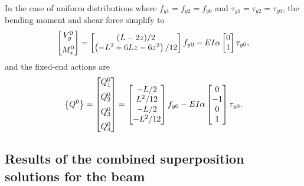 \documentclass{AeroStructure-ERJohnson}
\begin{document}
In the case of uniform distributions where $f_{y 1}=f_{y 2}=f_{y 0}$ and $\tau_{y 1}=\tau_{y 2}=\tau_{y 0}$, the bending moment and shear force simplify to
\begin{align}\label{eq16.55}
\left[\begin{array}{@{}c@{}}V_{y}^{0} \\[6pt] M_{x}^{0}\end{array}\right]=\left[\begin{array}{@{}c@{}}(L-2 z) / 2 \\\left(-L^{2}+6 L z-6 z^{2}\right) / 12\end{array}\right] f_{y 0}-E I \alpha\left[\begin{array}{@{}l@{}}0 \\1\end{array}\right] \tau_{y 0},
\end{align}
and the fixed-end actions are
\begin{align}\label{eq16.56}
\left\{Q^{0}\right\}=\left[\begin{array}{@{}c@{}}Q_{1}^{0} \\[6pt]Q_{2}^{0} \\[6pt]Q_{3}^{0} \\[6pt]Q_{4}^{0}\end{array}\right]=\left[\begin{array}{@{}c@{}}-L / 2 \\L^{2} / 12 \\-L / 2 \\-L^{2} / 12\end{array}\right] f_{y 0}-E I \alpha\left[\begin{array}{@{}c@{}}0 \\-1 \\0 \\1\end{array}\right] \tau_{y 0}.
\end{align}

\subsection{Results of the combined superposition solutions for the beam}\label{sec16.2.3}
\end{document}
